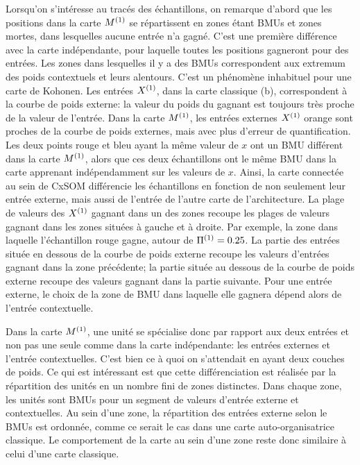 Lorsqu'on s'intéresse au tracés des échantillons, on remarque d'abord que les positions dans la carte $M^{({1})}$ se répartissent en zones étant BMUs et zones mortes, dans lesquelles aucune entrée n'a gagné. C'est une première différence avec la carte indépendante, pour laquelle toutes les positions gagneront pour des entrées. Les zones dans lesquelles il y a des BMUs correspondent aux extremum des poids contextuels et leurs alentours. C'est un phénomène inhabituel pour une carte de Kohonen. Les entrées $X^{({1})}$, dans la carte classique (b), correspondent à la courbe de poids externe: la valeur du poids du gagnant est toujours très proche de la valeur de l'entrée. Dans la carte $M^{({1})}$, les entrées externes $X^{({1})}$ orange sont proches de la courbe de poids externes, mais avec plus d'erreur de quantification.
Les deux points rouge et bleu ayant la même valeur de $x$ ont un BMU différent dans la carte $M^{({1})}$, alors que ces deux échantillons ont le même BMU dans la carte apprenant indépendamment sur les valeurs de $x$. Ainsi, la carte connectée au sein de CxSOM différencie les échantillons en fonction de non seulement leur entrée externe, mais aussi de l'entrée de l'autre carte de l'architecture. La plage de valeurs des $X^{({1})}$ gagnant dans un des zones recoupe les plages de valeurs gagnant dans les zones situées à gauche et à droite. Par exemple, la zone dans laquelle l'échantillon rouge gagne, autour de $\Pi^{({1})} = 0.25$. La partie des entrées située en dessous de la courbe de poids externe recoupe les valeurs d'entrées gagnant dans la zone précédente; la partie située au dessous de la courbe de poids externe recoupe des valeurs gagnant dans la partie suivante. Pour une entrée externe, le choix de la zone de BMU dans laquelle elle gagnera dépend alors de l'entrée contextuelle. 


Dans la carte $M^{({1})}$, une unité se spécialise donc par rapport aux deux entrées et non pas une seule comme dans la carte indépendante: les entrées externes et l'entrée contextuelles. C'est bien ce à quoi on s'attendait en ayant deux couches de poids. Ce qui est intéressant est que cette différenciation est réalisée par la répartition des unités en un nombre fini de zones distinctes. Dans chaque zone, les unités sont BMUs pour un segment de valeurs d'entrée externe et contextuelles. Au sein d'une zone, la répartition des entrées externe selon le BMUs est ordonnée, comme ce serait le cas dans une carte auto-organisatrice classique. Le comportement de la carte au sein d'une zone reste donc similaire à celui d'une carte classique.

